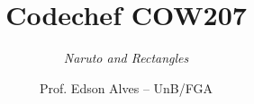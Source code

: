 \title{Codechef COW207}
\subtitle{\textit{Naruto and Rectangles}}
\author{Prof. Edson Alves -- UnB/FGA}
\date{}
